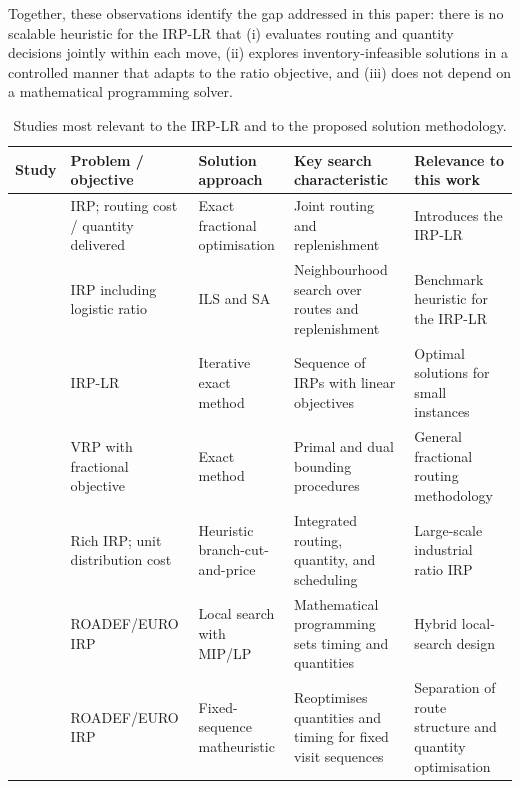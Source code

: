Together, these observations identify the gap addressed in this paper:
there is no scalable heuristic for the IRP-LR that (i) evaluates routing and
quantity decisions jointly within each move, (ii) explores
inventory-infeasible solutions in a controlled manner that adapts to the
ratio objective, and (iii) does not depend on a mathematical programming
solver.

\begin{table}[!htbp]
\centering
\caption{Studies most relevant to the IRP-LR and to the proposed solution
methodology.}
\label{tab:literature_irplr}
\scriptsize
\renewcommand{\arraystretch}{1.18}
\setlength{\tabcolsep}{3pt}
\begin{tabularx}{\textwidth}{
>{\raggedright\arraybackslash}p{2.3cm}
>{\raggedright\arraybackslash}p{2.6cm}
>{\raggedright\arraybackslash}p{2.8cm}
>{\raggedright\arraybackslash}X
>{\raggedright\arraybackslash}X}
\toprule
\textbf{Study} & \textbf{Problem / objective} & \textbf{Solution approach}
& \textbf{Key search characteristic} & \textbf{Relevance to this work} \\
\midrule
\citet{archetti2017logistic} & IRP; routing cost / quantity delivered
  & Exact fractional optimisation & Joint routing and replenishment
  & Introduces the IRP-LR \\
\citet{alvarez2018iterated} & IRP including logistic ratio
  & ILS and SA & Neighbourhood search over routes and replenishment
  & Benchmark heuristic for the IRP-LR \\
\citet{archetti2019exact} & IRP-LR & Iterative exact method
  & Sequence of IRPs with linear objectives
  & Optimal solutions for small instances \\
\citet{baldacci2020fractional} & VRP with fractional objective
  & Exact method & Primal and dual bounding procedures
  & General fractional routing methodology \\
\citet{absi2020branch} & Rich IRP; unit distribution cost
  & Heuristic branch-cut-and-price
  & Integrated routing, quantity, and scheduling
  & Large-scale industrial ratio IRP \\
\citet{su2020matheuristic} & ROADEF/EURO IRP & Local search with MIP/LP
  & Mathematical programming sets timing and quantities
  & Hybrid local-search design \\
\citet{he2020fixedsequence} & ROADEF/EURO IRP
  & Fixed-sequence matheuristic
  & Reoptimises quantities and timing for fixed visit sequences
  & Separation of route structure and quantity optimisation \\

\end{tabularx}
\end{table}

